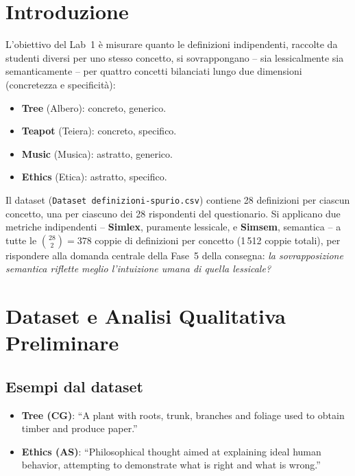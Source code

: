 \documentclass[12pt,a4paper]{article}
\begin{document}
\section{Introduzione}

L'obiettivo del Lab~1 \`e misurare quanto le definizioni indipendenti, raccolte da studenti diversi per uno stesso concetto, si sovrappongano -- sia lessicalmente sia semanticamente -- per quattro concetti bilanciati lungo due dimensioni (concretezza e specificit\`a):

\begin{itemize}[noitemsep]
  \item \textbf{Tree} (Albero): concreto, generico.
  \item \textbf{Teapot} (Teiera): concreto, specifico.
  \item \textbf{Music} (Musica): astratto, generico.
  \item \textbf{Ethics} (Etica): astratto, specifico.
\end{itemize}

Il dataset (\texttt{Dataset definizioni-spurio.csv}) contiene 28 definizioni per ciascun concetto, una per ciascuno dei 28 rispondenti del questionario. Si applicano due metriche indipendenti -- \textbf{Simlex}, puramente lessicale, e \textbf{Simsem}, semantica -- a tutte le $\binom{28}{2}=378$ coppie di definizioni per concetto (1\,512 coppie totali), per rispondere alla domanda centrale della Fase~5 della consegna: \emph{la sovrapposizione semantica riflette meglio l'intuizione umana di quella lessicale?}

\section{Dataset e Analisi Qualitativa Preliminare}

\subsection{Esempi dal dataset}

\begin{itemize}[noitemsep]
  \item \textbf{Tree (CG)}: ``A plant with roots, trunk, branches and foliage used to obtain timber and produce paper.''
  \item \textbf{Ethics (AS)}: ``Philosophical thought aimed at explaining ideal human behavior, attempting to demonstrate what is right and what is wrong.''
\end{itemize}
\end{document}
